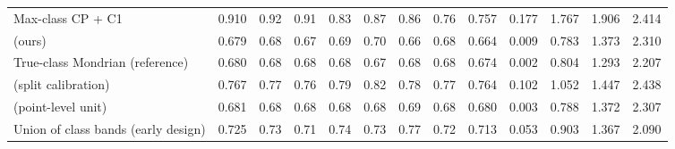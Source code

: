 \begin{table}[!htbp]
{\begin{tabular}{lcccccccccccc}
Max-class CP + C1 & 0.910 & 0.92 & 0.91 & 0.83 & 0.87 & 0.86 & 0.76 & 0.757 & 0.177 & 1.767 & 1.906 & 2.414 \\
\gamut{} (ours) & 0.679 & 0.68 & 0.67 & 0.69 & 0.70 & 0.66 & 0.68 & 0.664 & 0.009 & 0.783 & 1.373 & 2.310 \\
True-class Mondrian (reference) & 0.680 & 0.68 & 0.68 & 0.68 & 0.67 & 0.68 & 0.68 & 0.674 & 0.002 & 0.804 & 1.293 & 2.207 \\
\gamut{} (split calibration) & 0.767 & 0.77 & 0.76 & 0.79 & 0.82 & 0.78 & 0.77 & 0.764 & 0.102 & 1.052 & 1.447 & 2.438 \\
\gamut{} (point-level unit) & 0.681 & 0.68 & 0.68 & 0.68 & 0.68 & 0.69 & 0.68 & 0.680 & 0.003 & 0.788 & 1.372 & 2.307 \\
Union of class bands (early design) & 0.725 & 0.73 & 0.71 & 0.74 & 0.73 & 0.77 & 0.72 & 0.713 & 0.053 & 0.903 & 1.367 & 2.090 \\
\bottomrule
\end{tabular}}
\end{table}

